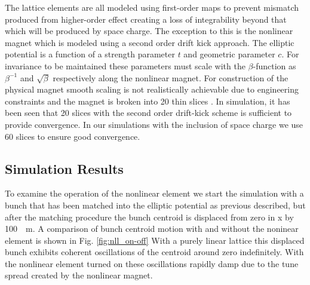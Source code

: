 \documentclass[aps,prstab,twocolumn, groupedaddress]{revtex4-1}
\begin{document}
The lattice elements are all modeled using first-order maps to prevent mismatch produced 
from higher-order effect creating a loss of integrability beyond that which will be 
produced by space charge. The exception to this is the nonlinear magnet which is 
modeled using a second order drift kick approach. The elliptic potential is a function of a 
strength parameter $t$ and geometric parameter $c$. For invariance to be maintained 
these parameters must scale with the $\beta$-function as $\beta^{-1}$ and $\sqrt{\beta}$ 
respectively along the nonlinear magnet. For construction of the physical magnet smooth 
scaling is not realistically achievable due to engineering constraints and the magnet is 
broken into 20 thin slices \cite{elliptic_magnet}. In simulation, it has been seen that 20 
slices with the second order drift-kick scheme is sufficient to provide convergence. In our 
simulations with the inclusion of space charge we use 60 slices to ensure good 
convergence.

\subsection{Simulation Results}
To examine the operation of the nonlinear element we start the simulation with a bunch 
that has been matched into the elliptic potential as previous described, but after the 
matching procedure the bunch centroid is displaced from zero in x by \SI{+100}{\mu m}. A 
comparison of bunch centroid motion with and without the noninear element is shown in 
Fig. \ref{fig:nll_on-off} With a purely linear lattice this displaced bunch exhibits coherent 
oscillations of the centroid around zero indefinitely. With the nonlinear element turned on 
these oscillations  rapidly damp due to the tune spread created by the nonlinear magnet. 
\end{document}
